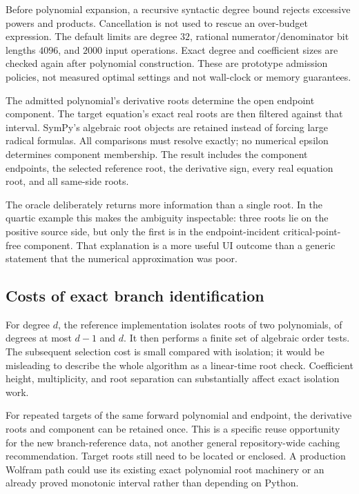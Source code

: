 \documentclass[11pt,letterpaper]{article}
\begin{document}
Before polynomial expansion, a recursive syntactic degree bound rejects excessive powers and products. Cancellation is not used to rescue an over-budget expression. The default limits are degree $32$, rational numerator/denominator bit lengths $4096$, and $2000$ input operations. Exact degree and coefficient sizes are checked again after polynomial construction. These are prototype admission policies, not measured optimal settings and not wall-clock or memory guarantees.

The admitted polynomial's derivative roots determine the open endpoint component. The target equation's exact real roots are then filtered against that interval. SymPy's algebraic root objects are retained instead of forcing large radical formulas. All comparisons must resolve exactly; no numerical epsilon determines component membership. The result includes the component endpoints, the selected reference root, the derivative sign, every real equation root, and all same-side roots.

The oracle deliberately returns more information than a single root. In the quartic example this makes the ambiguity inspectable: three roots lie on the positive source side, but only the first is in the endpoint-incident critical-point-free component. That explanation is a more useful UI outcome than a generic statement that the numerical approximation was poor.

\subsection{Costs of exact branch identification}

For degree $d$, the reference implementation isolates roots of two polynomials, of degrees at most $d-1$ and $d$. It then performs a finite set of algebraic order tests. The subsequent selection cost is small compared with isolation; it would be misleading to describe the whole algorithm as a linear-time root check. Coefficient height, multiplicity, and root separation can substantially affect exact isolation work.

For repeated targets of the same forward polynomial and endpoint, the derivative roots and component can be retained once. This is a specific reuse opportunity for the new branch-reference data, not another general repository-wide caching recommendation. Target roots still need to be located or enclosed. A production Wolfram path could use its existing exact polynomial root machinery or an already proved monotonic interval rather than depending on Python.
\end{document}
